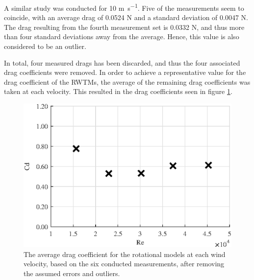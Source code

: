 A similar study was conducted for 10 \si{\m\per\s}. Five of the measurements seem to coincide, with an average drag of 0.0524 \si{\newton} and a standard deviation of 0.0047 \si{\newton}. The drag resulting from the fourth measurement set is 0.0332 \si{\newton}, and thus more than four standard deviations away from the average. Hence, this value is also considered to be an outlier.  


In total, four measured drags has been discarded, and thus the four associated drag coefficients were removed. In order to achieve a representative value for the drag coefficient of the \gls{RWTM}s, the average of the remaining drag coefficients was taken at each velocity. This resulted in the drag coefficients seen in figure \ref{fig:RotationalAvg}. 




\begin{figure}[h!]
    \centering
    \includegraphics[width=\linewidth]{0_Images/RotationalAverageRe.eps}
    \caption{The average drag coefficient for the rotational models at each wind velocity, based on the six conducted measurements, after removing the assumed errors and outliers.}
    \label{fig:RotationalAvg}
\end{figure}



